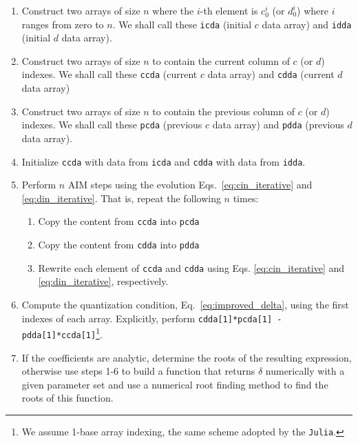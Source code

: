 \begin{enumerate}
  \item Construct two arrays of size $n$ where the $i$-th element is $c^i_0$ (or $d^i_0$) where $i$ ranges from zero to $n$. We shall call these \texttt{icda} (initial $c$ data array) and \texttt{idda} (initial $d$ data array).

  \item Construct two arrays of size $n$ to contain the current column of $c$ (or $d$) indexes. We shall call these \texttt{ccda} (current $c$ data array) and \texttt{cdda} (current $d$ data array)

  \item Construct two arrays of size $n$ to contain the previous column of $c$ (or $d$) indexes. We shall call these \texttt{pcda} (previous $c$ data array) and \texttt{pdda} (previous $d$ data array).

  \item Initialize \texttt{ccda} with data from \texttt{icda} and \texttt{cdda} with data from \texttt{idda}.

  \item Perform $n$ AIM steps using the evolution Eqs.~\eqref{eq:cin_iterative} and \eqref{eq:din_iterative}. That is, repeat the following $n$ times:
        \begin{enumerate}
          \item Copy the content from \texttt{ccda} into \texttt{pcda}
          \item Copy the content from \texttt{cdda} into \texttt{pdda}
          \item Rewrite each element of \texttt{ccda} and \texttt{cdda} using Eqs. \eqref{eq:cin_iterative} and \eqref{eq:din_iterative}, respectively.
        \end{enumerate}

  \item Compute the quantization condition, Eq.~\eqref{eq:improved_delta}, using the first indexes of each array. Explicitly, perform \texttt{cdda[1]*pcda[1] - pdda[1]*ccda[1]}\footnote{We assume 1-base array indexing, the same scheme adopted by the \texttt{Julia}.}.

  \item If the coefficients are analytic, determine the roots of the resulting expression, otherwise use steps 1-6 to build a function that returns $\delta$ numerically with a given parameter set and use a numerical root finding method to find the roots of this function.
\end{enumerate}
